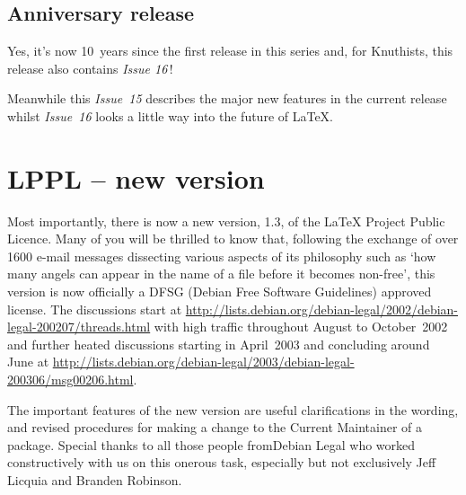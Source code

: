 \documentclass{ltnews}
\begin{document}
\maketitle


\subsection{Anniversary release}

Yes, it's now 10~years since the first release in this series and, for
Knuthists, this release also contains \textit{Issue 16}\,!

Meanwhile this \textit{Issue~15} describes the major new features in
the current release whilst \textit{Issue~16} looks\newline
a little way into the future of \LaTeX{}.


\section{LPPL -- new version}

Most importantly, there is now a new version, 1.3, of the \LaTeX{}
Project Public Licence.   Many of you will\newline
be thrilled to know that, following the exchange of over 1600 e-mail
messages dissecting various aspects of its philosophy such as `how
many angels can appear in the name of a file before it becomes
non-free', this version\newline
is now officially a DFSG (Debian Free Software Guidelines) approved license.
The discussions start at
\url{http://lists.debian.org/debian-legal/2002/debian-legal-200207/threads.html}
with high traffic throughout August to October~2002 and further
heated discussions starting in April~2003 and concluding
around June at
\url{http://lists.debian.org/debian-legal/2003/debian-legal-200306/msg00206.html}.

The important features of the new version are useful clarifications in
the wording, and revised procedures\newline
for making a change to the Current Maintainer of a package.  Special
thanks to all those people from\newline Debian Legal who worked
constructively with us\newline
on this onerous task, especially but not exclusively\newline
Jeff Licquia and Branden Robinson.
\end{document}
